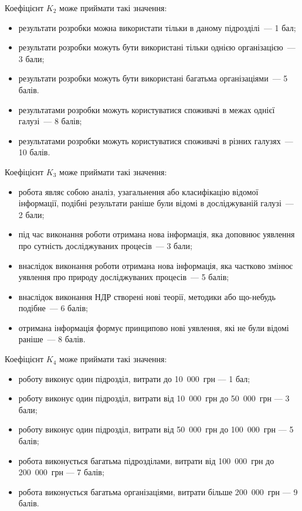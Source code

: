 \documentclass[a4paper,fontsize=14bp,ukrainian]{extreport}
\begin{document}
Коефіцієнт $K_2$ може приймати такі значення:
\begin{itemize}
\item результати розробки можна використати тільки в даному підрозділі~--- 1 бал;
\item результати розробки можуть бути використані тільки однією організацією~--- 3 бали;
\item результати розробки можуть бути використані багатьма організаціями~--- 5 балів.
\item результатами розробки можуть користуватися споживачі в межах однієї галузі~--- 8 балів;
\item результатами розробки можуть користуватися споживачі в різних галузях~--- 10 балів.
\end{itemize}

Коефіцієнт $K_3$ може приймати такі значення:
\begin{itemize}
\item робота являє собою аналіз, узагальнення або класифікацію відомої інформації, подібні результати раніше були відомі в досліджуваній галузі~--- 2 бали;
\item під час виконання роботи отримана нова інформація, яка доповнює уявлення про сутність досліджуваних процесів~--- 3 бали;
\item внаслідок виконання роботи отримана нова інформація, яка частково змінює уявлення про природу досліджуваних процесів~--- 5 балів;
\item внаслідок виконання НДР створені нові теорії, методики або що-небудь подібне~--- 6 балів;
\item отримана інформація формує принципово нові уявлення, які не були відомі раніше~--- 8 балів.
\end{itemize}

Коефіцієнт $K_4$ може приймати такі значення:
\begin{itemize}
\item роботу виконує один підрозділ, витрати до 10~000~грн --- 1 бал;
\item роботу виконує один підрозділ, витрати від 10~000~грн до 50~000~грн --- 3 бали;
\item роботу виконує один підрозділ, витрати від 50~000~грн до 100~000~грн --- 5 балів;
\item робота виконується багатьма підрозділами, витрати від 100~000~грн до 200~000~грн --- 7 балів;
\item робота виконується багатьма організаціями, витрати більше 200~000~грн --- 9 балів.
\end{itemize}
\end{document}
